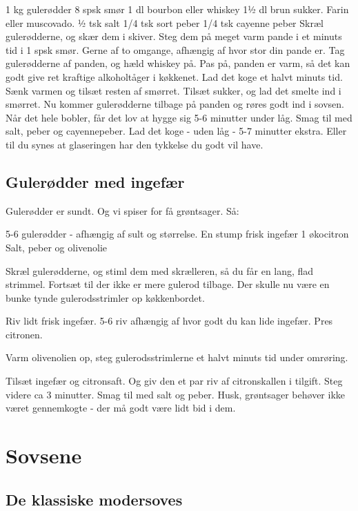 \documentclass[
]{book}
\begin{document}
1 kg gulerødder
8 spsk smør
1 dl bourbon eller whiskey
1½ dl brun sukker. Farin eller muscovado.
½ tsk salt
1/4 tsk sort peber
1/4 tsk cayenne peber
Skræl gulerødderne, og skær dem i skiver.
Steg dem på meget varm pande i et minuts tid i 1 spsk smør. Gerne af to omgange, afhængig af hvor stor din pande er.
Tag gulerødderne af panden, og hæld whiskey på. Pas på, panden er varm, så det kan godt give ret kraftige alkoholtåger i køkkenet. Lad det koge et halvt minuts tid. Sænk varmen og tilsæt resten af smørret.
Tilsæt sukker, og lad det smelte ind i smørret. Nu kommer gulerødderne tilbage på panden og røres godt ind i sovsen. Når det hele bobler, får det lov at hygge sig 5-6 minutter under låg.
Smag til med salt, peber og cayennepeber. Lad det koge - uden låg - 5-7 minutter ekstra. Eller til du synes at glaseringen har den tykkelse du godt vil have.

\section{Gulerødder med ingefær}\label{guleruxf8dder-med-ingefuxe6r}

Gulerødder er sundt. Og vi spiser for få grøntsager. Så:

5-6 gulerødder - afhængig af sult og størrelse.
En stump frisk ingefær
1 økocitron
Salt, peber og olivenolie

Skræl gulerødderne, og stiml dem med skrælleren, så du får en lang, flad strimmel. Fortsæt til der ikke er mere gulerod tilbage. Der skulle nu være en bunke tynde gulerodsstrimler op køkkenbordet.

Riv lidt frisk ingefær. 5-6 riv afhængig af hvor godt du kan lide ingefær. Pres citronen.

Varm olivenolien op, steg gulerodsstrimlerne et halvt minuts tid under omrøring.

Tilsæt ingefær og citronsaft. Og giv den et par riv af citronskallen i tilgift. Steg videre ca 3 minutter. Smag til med salt og peber. Husk, grøntsager behøver ikke været gennemkogte - der må godt være lidt bid i dem.

\chapter{Sovsene}\label{sovsene}

\section{De klassiske modersoves}\label{de-klassiske-modersoves}
\end{document}
